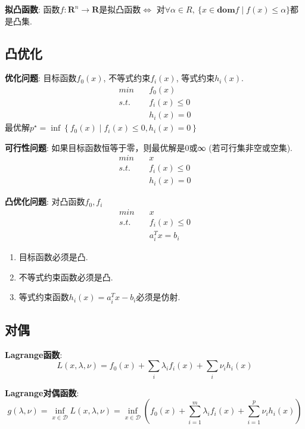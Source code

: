 \documentclass{article}
\begin{document}
        \textbf{拟凸函数}: 函数$f: \mathbf{R}^n \to \mathbf{R}$是拟凸函数$\Leftrightarrow$ 对$\forall \alpha \in R ,\ \{x \in \mathbf{dom} f \mid f(x) \leqslant \alpha\}$都是凸集.
        
    \subsection{凸优化}
        \textbf{优化问题}: 目标函数$f_0(x)$, 不等式约束$f_i(x)$, 等式约束$h_i(x)$.
            \begin{align*}
                min &\quad f_0(x) \\
                s.t.&\quad f_i(x) \leqslant 0\\
                    &\quad h_i(x) = 0
            \end{align*}
            \quad 最优解$p^{\star}=\inf \left\{f_{0}(x) \mid f_{i}(x) \leqslant 0, h_{i}(x) = 0\right\}$
            
        \textbf{可行性问题}: 如果目标函数恒等于零，则最优解是0或∞ (若可行集非空或空集).
            \begin{align*}
                min &\quad x \\
                s.t.&\quad f_i(x) \leqslant 0\\
                    &\quad h_i(x) = 0
            \end{align*}

        \textbf{凸优化问题}: 对凸函数$f_0, f_i$
            \begin{align*}
                min &\quad x \\
                s.t.&\quad f_i(x) \leqslant 0\\
                    &\quad a_i^T x = b_i
            \end{align*}
            \begin{enumerate}
                \item 目标函数必须是凸.
                \item 不等式约束函数必须是凸.
                \item 等式约束函数$h_i(x)= a_i^T x- b_i$必须是仿射.
            \end{enumerate}
            
    \subsection{对偶}
        \textbf{Lagrange函数}: 
            $$L(x, \lambda, \nu) = f_0(x) + \sum_{i} \lambda_i f_i(x) + \sum_i \nu_i h_i(x)$$
            
        \textbf{Lagrange对偶函数}: 
            $$g(\lambda, \nu)=\inf _{x \in \mathcal{D}} L(x, \lambda, \nu)=\inf _{x \in \mathcal{D}}\left(f_{0}(x)+\sum_{i=1}^{m} \lambda_{i} f_{i}(x)+\sum_{i=1}^{p} \nu_{i} h_{i}(x)\right)$$
        
\end{document}
